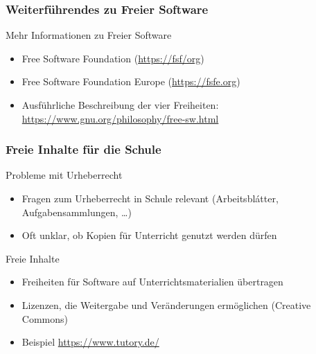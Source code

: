 \documentclass{beamer}
\begin{document}
\begin{frame}
  \frametitle{Weiterführendes zu Freier Software}

  \onslide<+->

  \begin{block}{Mehr Informationen zu Freier Software}
    \begin{itemize}
    \item Free Software Foundation (\url{https://fsf/org})
    \item Free Software Foundation Europe (\url{https://fsfe.org})
    \item Ausführliche Beschreibung der vier Freiheiten:
      \url{https://www.gnu.org/philosophy/free-sw.html}
    \end{itemize}
  \end{block}

\end{frame}


\begin{frame}
  \frametitle{Freie Inhalte für die Schule}

  \onslide<+->

  \begin{block}{Probleme mit Urheberrecht}
    \begin{itemize}
    \item Fragen zum Urheberrecht in Schule relevant (Arbeitsblátter,
      Aufgabensammlungen, \dots)
    \item Oft unklar, ob Kopien für Unterricht genutzt werden dürfen
    \end{itemize}
  \end{block}

  \onslide<+->

  \begin{block}{Freie Inhalte}
    \begin{itemize}
    \item Freiheiten für Software auf Unterrichtsmaterialien übertragen
    \item Lizenzen, die Weitergabe und Veränderungen ermöglichen (Creative
      Commons)
    \item Beispiel \url{https://www.tutory.de/}
    \end{itemize}
  \end{block}


\end{frame}
\end{document}
